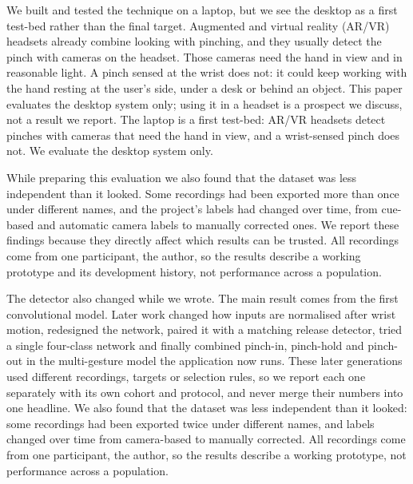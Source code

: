 \iffull
We built and tested the technique on a laptop, but we see the desktop as a first test-bed rather than the final target. Augmented and virtual reality (AR/VR) headsets already combine looking with pinching, and they usually detect the pinch with cameras on the headset. Those cameras need the hand in view and in reasonable light. A pinch sensed at the wrist does not: it could keep working with the hand resting at the user's side, under a desk or behind an object. This paper evaluates the desktop system only; using it in a headset is a prospect we discuss, not a result we report.
\else
The laptop is a first test-bed: AR/VR headsets detect pinches with cameras that need the hand in view, and a wrist-sensed pinch does not. We evaluate the desktop system only.
\fi

\iffull
While preparing this evaluation we also found that the dataset was less independent than it looked. Some recordings had been exported more than once under different names, and the project's labels had changed over time, from cue-based and automatic camera labels to manually corrected ones. We report these findings because they directly affect which results can be trusted. All recordings come from one participant, the author, so the results describe a working prototype and its development history, not performance across a population.

The detector also changed while we wrote. The main result comes from the first convolutional model. Later work changed how inputs are normalised after wrist motion, redesigned the network, paired it with a matching release detector, tried a single four-class network and finally combined pinch-in, pinch-hold and pinch-out in the multi-gesture model the application now runs. These later generations used different recordings, targets or selection rules, so we report each one separately with its own cohort and protocol, and never merge their numbers into one headline.
\else
We also found that the dataset was less independent than it looked: some recordings had been exported twice under different names, and labels changed over time from camera-based to manually corrected. All recordings come from one participant, the author, so the results describe a working prototype, not performance across a population.
\fi


